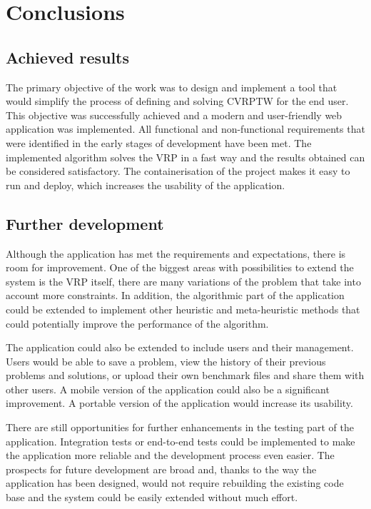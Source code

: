 \documentclass[a4paper,twoside,12pt]{book}
\begin{document}
 

\chapter{Conclusions}
\section{Achieved results}
The primary objective of the work was to design and implement a tool that would simplify the process of defining and solving CVRPTW for the end user. This objective was successfully achieved and a modern and user-friendly web application was implemented. All functional and non-functional requirements that were identified in the early stages of development have been met. The implemented algorithm solves the VRP in a fast way and the results obtained can be considered satisfactory. The containerisation of the project makes it easy to run and deploy, which increases the usability of the application.

\section{Further development}
Although the application has met the requirements and expectations, there is room for improvement. One of the biggest areas with possibilities to extend the system is the VRP itself, there are many variations of the problem that take into account more constraints. In addition, the algorithmic part of the application could be extended to implement other heuristic and meta-heuristic methods that could potentially improve the performance of the algorithm.

The application could also be extended to include users and their management. Users would be able to save a problem, view the history of their previous problems and solutions, or upload their own benchmark files and share them with other users. A mobile version of the application could also be a significant improvement. A portable version of the application would increase its usability.

There are still opportunities for further enhancements in the testing part of the application. Integration tests or end-to-end tests could be implemented to make the application more reliable and the development process even easier.
The prospects for future development are broad and, thanks to the way the application has been designed, would not require rebuilding the existing code base and the system could be easily extended without much effort.
\end{document}
